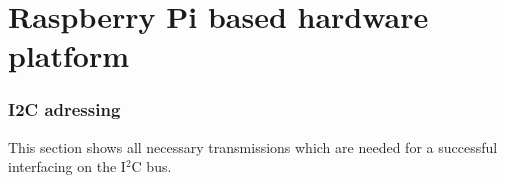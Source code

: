 \chapter{Raspberry Pi based hardware platform}
\label{sec:hardware}
\subsection{I2C adressing}
\label{sec:hardware:Components:Adressing}

This section shows all necessary transmissions which are needed for a successful interfacing on the I$^2$C bus. 

